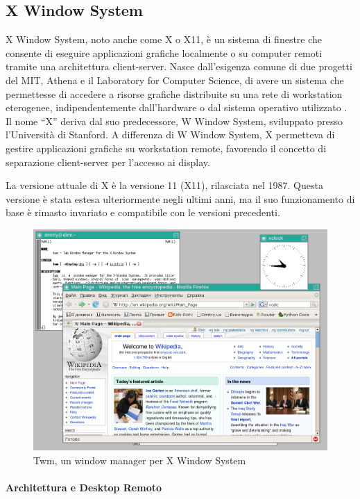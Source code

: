 \documentclass[12pt,a4paper,openright,twoside]{book}
\begin{document}
\subsection{X Window System}
X Window System, noto anche come X o X11, è un sistema di finestre che consente di eseguire applicazioni grafiche localmente o su computer remoti tramite una architettura client-server. 
Nasce dall'esigenza comune di due progetti del MIT,
Athena e il Laboratory for Computer Science,
di avere un sistema che permettesse di accedere a risorse grafiche distribuite su una rete di workstation eterogenee, indipendentemente dall'hardware o dal sistema operativo utilizzato \cite{Scheifler1986}.
%
Il nome ``X'' deriva dal suo predecessore,
W Window System,
sviluppato presso l'Università di Stanford.
%
A differenza di W Window System, X permetteva di gestire applicazioni grafiche su workstation remote, favorendo il concetto di separazione client-server per l'accesso ai display.

La versione attuale di X è la versione 11 (X11), rilasciata nel 1987.
%
Questa versione è stata estesa ulteriormente negli ultimi anni,
ma il suo funzionamento di base è rimasto invariato e compatibile con le versioni precedenti.

\begin{figure}
    \centering
    \includegraphics[width=.5\linewidth]{figures/Twm.png}
    \caption[xarch]{Twm, un window manager per X Window System \footnotemark}
\end{figure}

\paragraph{Architettura e Desktop Remoto}
\end{document}
